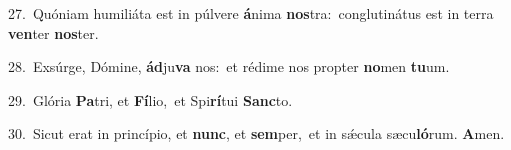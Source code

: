 {\numbfont\textcolor{\numbcolor}{27.}}~Quóniam humiliáta est in púlvere \textbf{á}\-nima \textbf{nos}\-tra:~\star conglutinátus est in terra \textbf{ven}\-ter \textbf{nos}\-ter.\par
{\numbfont\textcolor{\numbcolor}{28.}}~Exsúrge, Dómine, \textbf{ád}\-ju\textbf{va} nos:~\star et rédime nos propter \textbf{no}\-men \textbf{tu}\-um.\par
{\numbfont\textcolor{\numbcolor}{29.}}~Glória \textbf{Pa}\-tri, et \textbf{Fí}\-lio,~\star et Spi\-\textbf{rí}\-tui \textbf{Sanc}\-to.\par
{\numbfont\textcolor{\numbcolor}{30.}}~Sicut erat in princípio, et \textbf{nunc}\-, et \textbf{sem}\-per,~\star et in sǽcula sæcu\-\textbf{ló}\-rum. \textbf{A}\-men.\par
